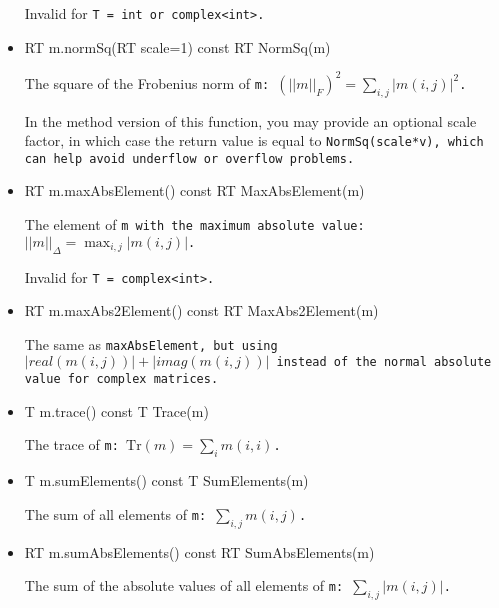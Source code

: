 \begin{itemize}
Invalid for \tt{T = int} or \tt{complex<int>}.

\item
\begin{tmvcode}
RT m.normSq(RT scale=1) const
RT NormSq(m)
\end{tmvcode}
The square of the Frobenius norm of \tt{m}: 
$(||m||_F)^2 = \sum_{i,j} |m(i,j)|^2$.

In the method version of this function, you may provide an optional scale factor,
in which case the return value is equal to \tt{NormSq(scale*v)}, 
which can help avoid underflow or overflow problems.

\item
\begin{tmvcode}
RT m.maxAbsElement() const
RT MaxAbsElement(m)
\end{tmvcode}
The element of \tt{m} with the maximum absolute value: 
$||m||_\Delta = \max_{i,j} |m(i,j)|$.  

Invalid for \tt{T = complex<int>}.

\item
\begin{tmvcode}
RT m.maxAbs2Element() const
RT MaxAbs2Element(m)
\end{tmvcode}
The same as \tt{maxAbsElement}, but using $|real(m(i,j))| + |imag(m(i,j))|$ instead
of the normal absolute value for complex matrices.

\item
\begin{tmvcode}
T m.trace() const
T Trace(m)
\end{tmvcode}
The trace of \tt{m}: $\mathrm{Tr}(m) = \sum_i m(i,i)$.

\item
\begin{tmvcode}
T m.sumElements() const
T SumElements(m)
\end{tmvcode}
The sum of all elements of \tt{m}: $\sum_{i,j} m(i,j)$.

\item
\begin{tmvcode}
RT m.sumAbsElements() const
RT SumAbsElements(m)
\end{tmvcode}
The sum of the absolute values of all elements of \tt{m}: $\sum_{i,j} |m(i,j)|$.


\end{itemize}
